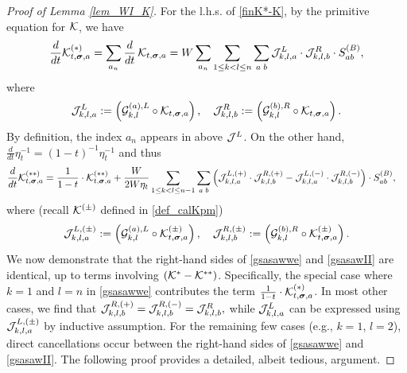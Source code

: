 \documentclass[10pt,reqno]{article}
\theoremstyle{plain} %
\theoremstyle{remark}
\numberwithin{equation}{section}
\begin{document}
\begin{proof}[Proof of Lemma \ref{lem_WI_K}]
 For the l.h.s. of \eqref{finK*-K}, by the primitive equation for  $\cal K$, we have 
  \begin{align} \label{gsasawwe}
     \frac{d}{dt} {\cal K}^{(*)}_{t, \boldsymbol{\sigma}, \textbf{a}}=\sum_{a_n} \frac{d}{dt}\,{\cal K}_{t, \boldsymbol{\sigma}, \textbf{a}} 
       =  
       {W}\sum_{a_n}  \sum_{1 \le k < l \le n}  
       \sum_{a\;b} 
        {\cal J}^{L}_{k,l,a}\cdot{\cal J}^{R}_{k,l,b}\cdot S^{(B)}_{ab},  
    \end{align}
    where %
    $$
    {\cal J}^L_{k,l,a}:= \left( {\cal G}^{(a), L}_{k, l} \circ {\cal K}_{t, \boldsymbol{\sigma}, \textbf{a}} \right), \quad
    {\cal J}^R_{k,l,b}:=\left( {\cal G}^{(b), R}_{k, l} \circ {\cal K}_{t, \boldsymbol{\sigma}, \textbf{a}} \right).
    $$
By definition, the index $a_n$ appears  in above $  {\cal J}^{L} $.    On the other hand,  $\frac{d}{dt} \eta_t^{-1}=(1-t)^{-1}\eta_t^{-1}$ and thus 
  \begin{align} \label{gsasawII}
     \frac{d}{dt} {\cal K}^{(**)}_{t, \boldsymbol{\sigma}, \textbf{a}}=\frac1{1-t}\cdot {\cal K}^{(**)}_{t, \boldsymbol{\sigma}, \textbf{a}}+ 
       \frac{W}{2W\eta_t}  \sum_{1\le k<l\le n-1} 
       \sum_{a\;b} 
       \left(
       {\cal J}^{L,(+)}_{k,l,a}\cdot{\cal J}^{R,(+)}_{k,l,b}
       -
      {\cal J}^{L,(-)}_{k,l,a}\cdot{\cal J}^{R,(-)}_{k,l,b}
       \right)\cdot S^{(B)}_{ab},
       \quad   
    \end{align}
 where (recall $\cal K^{(\pm)}$ defined in \eqref{def_calKpm})
 $$
    {\cal J}^{L,(\pm)}_{k,l,a}:= 
    \left( {\cal G}^{(a), L}_{k, l} \circ {\cal K}^{(\pm)}_{t, \boldsymbol{\sigma}, \textbf{a}} \right), \quad
    {\cal J}^{R,(\pm)}_{k,l,b}:=\left( {\cal G}^{(b), R}_{k, l} \circ  {\cal K}^{(\pm)}_{t, \boldsymbol{\sigma}, \textbf{a}} \right).
$$
We now demonstrate that the right-hand sides of \eqref{gsasawwe} and \eqref{gsasawII} are identical, up to terms involving \(({\cal K}^* - {\cal K}^{**})\). Specifically, the special case where \(k = 1\) and \(l = n\) in \eqref{gsasawwe} contributes the term \(\frac{1}{1-t} \cdot {\cal K}^{(*)}_{t, \boldsymbol{\sigma}, \textbf{a}}\). In most other cases, we find that 
$
{\cal J}^{R,(+)}_{k,l,b} = {\cal J}^{R,(-)}_{k,l,b} = {\cal J}^{R}_{k,l,b},
$
while 
$
{\cal J}^{L}_{k,l,a}
$  
can be expressed using 
$
{\cal J}^{L,(\pm)}_{k,l,a}
$
by inductive assumption. For the remaining few cases (e.g., \(k = 1\), \(l = 2\)), direct cancellations occur between the right-hand sides of \eqref{gsasawwe} and \eqref{gsasawII}. The following proof provides a detailed, albeit tedious,  argument. 
 




\end{proof}
\end{document}
